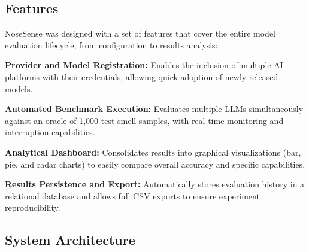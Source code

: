\documentclass[sigconf]{acmart}
\begin{document}
\subsection{Features}
\label{subsec:funcionalidades}

NoseSense was designed with a set of features that cover the entire model evaluation lifecycle, from configuration to results analysis:

    \textbf{Provider and Model Registration:} Enables the inclusion of multiple AI platforms with their credentials, allowing quick adoption of newly released models.
    
    \textbf{Automated Benchmark Execution:} Evaluates multiple LLMs simultaneously against an oracle of 1,000 test smell samples, with real-time monitoring and interruption capabilities.
    
    \textbf{Analytical Dashboard:} Consolidates results into graphical visualizations (bar, pie, and radar charts) to easily compare overall accuracy and specific capabilities.
    
    \textbf{Results Persistence and Export:} Automatically stores evaluation history in a relational database and allows full CSV exports to ensure experiment reproducibility.


\subsection{System Architecture}
\label{subsec:arquitetura}
\end{document}
